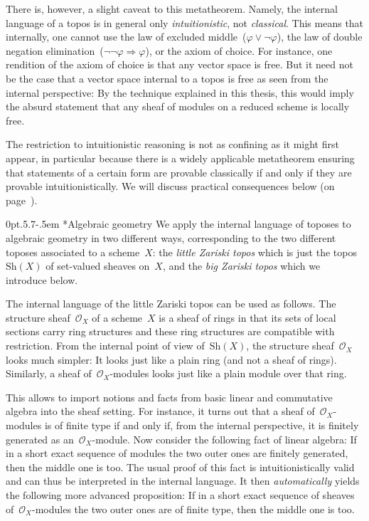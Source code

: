 \documentclass[10pt,reqno,a4paper]{amsbook}
\makeatletter
\theoremstyle{definition}
\theoremstyle{plain}
\theoremstyle{remark}
\renewcommand{\O}{\mathcal{O}}
\newcommand{\Sh}{\mathrm{Sh}}
\newcommand{\?}{\,{:}\,}
\renewcommand{\_}{\mathpunct{.}\,}
\def\subsection{\@startsection{subsection}{2}%
  {0pt}{.5\linespacing\@plus.7\linespacing}{-.5em}%
  {\normalfont\bfseries}}
\makeatother
\begin{document}
{There is, however, a slight caveat to this metatheorem. Namely, the internal
language of a topos is in general only \emph{intuitionistic}, not
\emph{classical}. This means that internally, one cannot use the law of
excluded middle~($\varphi \vee \neg\varphi$), the law of double negation
elimination~($\neg\neg\varphi \Rightarrow \varphi$), or the axiom of choice.
For instance, one rendition of the axiom of choice is that any vector space is
free. But it need not be the case that a vector space internal to a topos
is free as seen from the internal perspective: By the technique explained in
this thesis, this would imply the absurd statement that any sheaf of modules on
a reduced scheme is locally free.

The restriction to intuitionistic reasoning is not as confining as it might first
appear, in particular because there is a widely applicable metatheorem ensuring
that statements of a certain form are provable classically if and only if they
are provable intuitionistically. We will discuss practical consequences below (on
page~\pageref{sect:appreciating-intuitionistic-logic}).


\subsection*{Algebraic geometry}
We apply the internal language of toposes to algebraic geometry in two
different ways, corresponding to the two different toposes associated to a
scheme~$X$: the \emph{little Zariski topos} which is just the topos~$\Sh(X)$ of
set-valued sheaves on~$X$, and the \emph{big Zariski topos} which we introduce
below.

The internal language of the little Zariski topos can be used as follows.
The structure sheaf~$\O_X$ of a scheme~$X$ is a sheaf of rings in that its sets of
local sections carry ring structures and these ring structures are compatible
with restriction. From the internal point of view of~$\Sh(X)$,
the structure
sheaf~$\O_X$ looks much simpler: It looks just like a plain ring (and
not a sheaf of rings). Similarly, a sheaf of~$\O_X$-modules looks just like a
plain module over that ring.

This allows to import notions and facts from basic linear and commutative
algebra into the sheaf setting. For instance, it turns out that a sheaf
of~$\O_X$-modules is of finite type if and only if, from the internal
perspective, it is finitely generated as an~$\O_X$-module. Now consider the
following fact of linear algebra: If in a short exact sequence of modules the two
outer ones are finitely generated, then the middle one is too. The usual proof of
this fact is intuitionistically valid and can thus be interpreted in the
internal language. It then \emph{automatically} yields the following more advanced
proposition: If in a short exact sequence of sheaves of~$\O_X$-modules the
two outer ones are of finite type, then the middle one is too.

}
\end{document}
